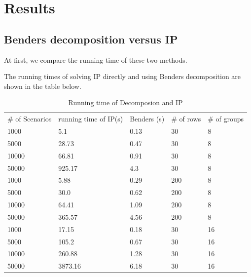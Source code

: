 
\section{Results}




\subsection{Benders decomposition versus IP}\label{Bender_IP}


At first, we compare the running time of these two methods.

The running times of solving IP directly and using Benders decomposition are shown in the table below. 

\begin{table}[ht]
  \centering
  \caption{Running time of Decomposion and IP}
  \begin{tabular}{l|l|l|l|l}
  \hline
  \# of Scenarios & running time of IP(s) & Benders (s) & \# of rows & \# of groups \\
  1000  & 5.1  & 0.13 & 30 & 8 \\
  5000  & 28.73 & 0.47 & 30 & 8 \\
  10000 & 66.81  & 0.91 & 30 & 8 \\
  50000 & 925.17 & 4.3 & 30 & 8 \\
  \hline
  1000  & 5.88 & 0.29 & 200 & 8 \\
  5000  & 30.0 & 0.62 & 200 & 8 \\
  10000 & 64.41 & 1.09 & 200 & 8 \\
  50000 & 365.57 & 4.56 & 200 & 8 \\
  \hline
  1000  & 17.15  & 0.18 & 30 & 16  \\
  5000  & 105.2  & 0.67 & 30 & 16  \\
  10000 & 260.88 & 1.28 & 30 & 16  \\
  50000 & 3873.16 & 6.18 & 30 & 16  \\
  \hline
  \end{tabular}
\end{table}

